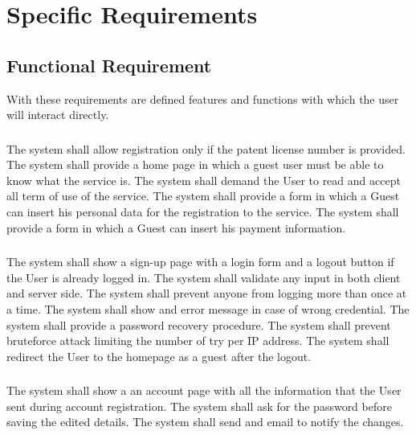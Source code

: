 
\section{Specific Requirements}


\subsection{Functional Requirement}

With these requirements are defined features and functions with which
the user will interact directly.



\subsubsection{}
\begin{itemize}
	\reqcounter The system shall allow registration only if the patent license number is provided.
	\reqcounter The system shall provide a home page in which a guest user must be
	able to know what the service is. 
	\reqcounter The system shall demand the User to read and accept all term of use of the service.
	\reqcounter The system shall provide a form in which a Guest can insert his personal data for the registration to the service.
	\reqcounter The system shall provide a form in which a Guest can insert his payment information.
	
	
\end{itemize}

\subsubsection{}
\begin{itemize}
	\reqcounter The system shall show a sign-up page with a login form and a logout button if the User is already logged in.
	\reqcounter The system shall validate any input in both client and server side.
	\reqcounter The system shall prevent anyone from logging more than once at a time.
	\reqcounter The system shall show and error message in case of wrong credential.
	\reqcounter The system shall provide a password recovery procedure.
	\reqcounter The system shall prevent bruteforce attack limiting the number of try per IP address.
	\reqcounter The system shall redirect the User to the homepage as a guest after the logout.
\end{itemize}



\subsubsection{}
\begin{itemize}
	\reqcounter The system shall show a an account page with all the information that the User sent during 
	account registration.
	\reqcounter The system shall ask for the password before saving the edited details.
	\reqcounter The system shall send and email to notify the changes.
\end{itemize}




